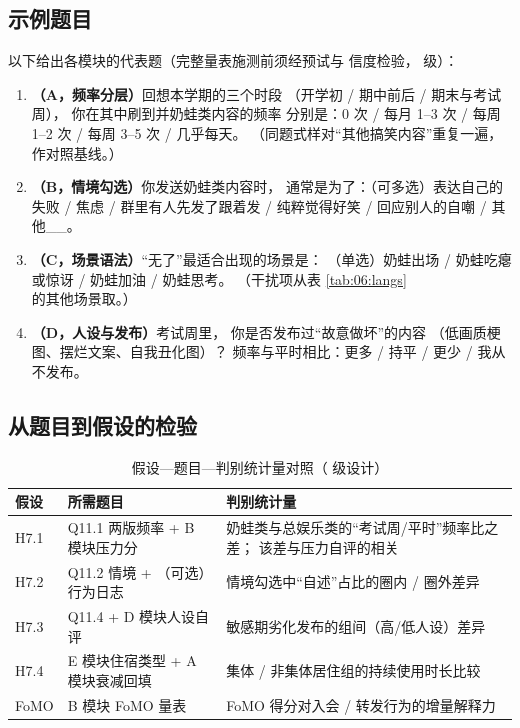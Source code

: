 \subsection{示例题目}

以下给出各模块的代表题（完整量表施测前须经预试与
信度检验， 级）：

\begin{enumerate}[label=\textbf{Q11.\arabic*},leftmargin=4.2em,itemsep=0.3em]
  \item \textbf{（A，频率分层）}回想本学期的三个时段
        （开学初 / 期中前后 / 期末与考试周），
        你在其中刷到并奶蛙类内容的频率
        分别是：0 次 / 每月 1--3 次 / 每周 1--2 次 /
        每周 3--5 次 / 几乎每天。
        （同题式样对“其他搞笑内容”重复一遍，作对照基线。）
  \item \textbf{（B，情境勾选）}你发送奶蛙类内容时，
        通常是为了：（可多选）表达自己的失败 / 焦虑 /
        群里有人先发了跟着发 / 纯粹觉得好笑 /
        回应别人的自嘲 / 其他\_\_。
  \item \textbf{（C，场景语法）}“无了”最适合出现的场景是：
        （单选）奶蛙出场 / 奶蛙吃瘪或惊讶 /
        奶蛙加油 / 奶蛙思考。
        （干扰项从表 \ref{tab:06:langs} 的其他场景取。）
  \item \textbf{（D，人设与发布）}考试周里，
        你是否发布过“故意做坏”的内容
        （低画质梗图、摆烂文案、自我丑化图）？
        频率与平时相比：更多 / 持平 / 更少 / 我从不发布。
\end{enumerate}

\subsection{从题目到假设的检验}

\begin{table}[htbp]\centering
  \caption{假设—题目—判别统计量对照（ 级设计）}
  \label{tab:11:hypmap}
  \small
  \begin{tabularx}{\textwidth}{@{}lXX@{}}
    \toprule
    假设 & 所需题目 & 判别统计量 \\ \midrule
    H7.1 & Q11.1 两版频率 + B 模块压力分 &
      奶蛙类与总娱乐类的“考试周/平时”频率比之差；
      该差与压力自评的相关 \\
    H7.2 & Q11.2 情境 + （可选）行为日志 &
      情境勾选中“自述”占比的圈内 / 圈外差异 \\
    H7.3 & Q11.4 + D 模块人设自评 &
      敏感期劣化发布的组间（高/低人设）差异 \\
    H7.4 & E 模块住宿类型 + A 模块衰减回填 &
      集体 / 非集体居住组的持续使用时长比较 \\
    FoMO & B 模块 FoMO 量表 &
      FoMO 得分对入会 / 转发行为的增量解释力 \\
    \bottomrule
  \end{tabularx}
\end{table}


